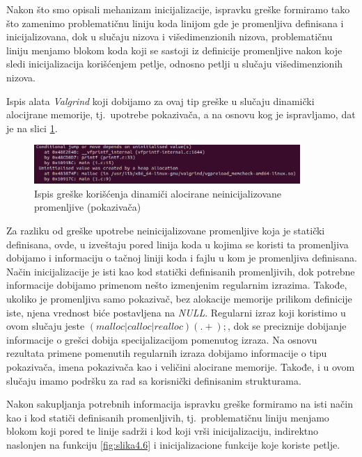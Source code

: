 \documentclass[12pt,oneside]{memoir}
\theoremstyle{plain}
\theoremstyle{definition}
\begin{document}
Nakon što smo opisali mehanizam inicijalizacije, ispravku greške formiramo tako što zamenimo problematičnu liniju koda linijom gde je promenljiva definisana i inicijalizovana, dok u slučaju nizova i višedimenzionih nizova, problematičnu liniju menjamo blokom koda koji se sastoji iz definicije promenljive nakon koje sledi inicijalizacija korišćenjem petlje, odnosno petlji u slučaju višedimenzionih nizova. 

Ispis alata \textit{Valgrind} koji dobijamo za ovaj tip greške u slučaju dinamički alocijrane memorije, tj.~upotrebe pokazivača, a na osnovu kog je ispravljamo, dat je na slici \ref{fig:slika4.7}.

\begin{figure}[!ht]
  \centering
  \includegraphics[width=0.9\textwidth]{UninitialisedDinamic.png}
  \caption{Ispis greške korišćenja dinamiči alocirane neinicijalizovane promenljive (pokazivača)}
  \label{fig:slika4.7}
\end{figure} 

Za razliku od greške upotrebe neinicijalizovane promenljive koja je statički definisana, ovde, u izveštaju pored linija koda u kojima se koristi ta promenljiva dobijamo i informaciju o tačnoj liniji koda i fajlu u kom je promenljiva definisana. Način inicijalizacije je isti kao kod statički definisanih promenljivih, dok potrebne informacije dobijamo primenom nešto izmenjenim regularnim izrazima. Takođe, ukoliko je promenljiva samo pokazivač, bez alokacije memorije prilikom definicije iste, njena vrednost biće postavljena na \textit{NULL}. Regularni izraz koji koristimo u ovom slučaju jeste $ (malloc|calloc|realloc)(.+); $, dok se preciznije dobijanje informacije o grešci dobija specijalizacijom pomenutog izraza. Na osnovu rezultata primene pomenutih regularnih izraza dobijamo informacije o tipu pokazivača, imena pokazivača kao i veličini alocirane memorije. Takođe, i u ovom slučaju imamo podršku za rad sa korisnički definisanim strukturama. 

Nakon sakupljanja potrebnih informacija ispravku greške formiramo na isti način kao i kod statiči definisanih promenljivih, tj.~problematičnu liniju menjamo blokom koji pored te linije sadrži i kod koji vrši inicijalizaciju, indirektno naslonjen na funkciju \ref{fig:slika4.6} i inicijalizacione funkcije koje koriste petlje.
\end{document}
